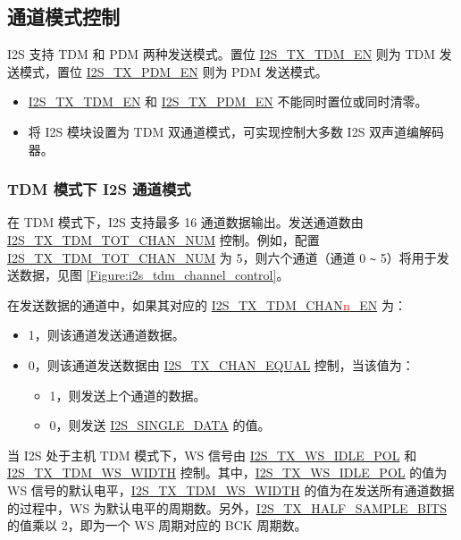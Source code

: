 \documentclass[main\_\_CN.tex]{subfiles}
\begin{document}
\subsection{通道模式控制}
\chipname{} I2S 支持 TDM 和 PDM 两种发送模式。置位 \hyperref[fielddesc:I2STXTDMEN]{I2S\_TX\_TDM\_EN} 则为 TDM 发送模式，置位 \hyperref[fielddesc:I2STXPDMEN]{I2S\_TX\_PDM\_EN} 则为 PDM 发送模式。

\begin{tiplisting}
\vspace{-2em}
\begin{itemize}
    \item \hyperref[fielddesc:I2STXTDMEN]{I2S\_TX\_TDM\_EN} 和 \hyperref[fielddesc:I2STXPDMEN]{I2S\_TX\_PDM\_EN} 不能同时置位或同时清零。
    \item 将 I2S 模块设置为 TDM 双通道模式，可实现控制大多数 I2S 双声道编解码器。
    \end{itemize}
\end{tiplisting}


\subsubsection{TDM 模式下 I2S 通道模式} \label{sec:tdm-channel-mode}
在 TDM 模式下，I2S 支持最多 16 通道数据输出。发送通道数由 \hyperref[fielddesc:I2STXTDMTOTCHANNUM]{I2S\_TX\_TDM\_TOT\_CHAN\_NUM} 控制。例如，配置 \hyperref[fielddesc:I2STXTDMTOTCHANNUM]{I2S\_TX\_TDM\_TOT\_CHAN\_NUM} 为 5，则六个通道（通道 0 \verb+~+ 5）将用于发送数据，见图
\ref{Figure:i2s_tdm_channel_control}。

在发送数据的通道中，如果其对应的 \hyperref[fielddesc:I2STXTDMCHAN0EN]{I2S\_TX\_TDM\_CHAN{\textcolor{red}{n}}\_EN} 为：

\begin{itemize}
    \item 1，则该通道发送通道数据。
    \item 0，则该通道发送数据由 \hyperref[fielddesc:I2STXCHANEQUAL]{I2S\_TX\_CHAN\_EQUAL} 控制，当该值为：
    \begin{itemize}
        \item 1，则发送上个通道的数据。
        \item 0，则发送 \hyperref[fielddesc:I2SSINGLEDATA]{I2S\_SINGLE\_DATA} 的值。
    \end{itemize}
\end{itemize}
当 I2S 处于主机 TDM 模式下，WS 信号由 \hyperref[fielddesc:I2STXWSIDLEPOL]{I2S\_TX\_WS\_IDLE\_POL} 和 \hyperref[fielddesc:I2STXTDMWSWIDTH]{I2S\_TX\_TDM\_WS\_WIDTH} 控制。其中，\hyperref[fielddesc:I2STXWSIDLEPOL]{I2S\_TX\_WS\_IDLE\_POL} 的值为 WS 信号的默认电平，\hyperref[fielddesc:I2STXTDMWSWIDTH]{I2S\_TX\_TDM\_WS\_WIDTH} 的值为在发送所有通道数据的过程中，WS 为默认电平的周期数。另外，\hyperref[fielddesc:I2STXHALFSAMPLEBITS]{I2S\_TX\_HALF\_SAMPLE\_BITS} 的值乘以 2，即为一个 WS 周期对应的 BCK 周期数。
\end{document}
